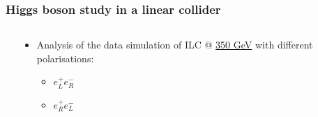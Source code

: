 \documentclass{beamer}
\begin{document}
    \begin{frame}
    \frametitle{Higgs boson study in a linear collider}

    \vspace{-0.3cm}
    \begin{columns}[c]
        \begin{column}{5cm}
            \begin{center}
            \end{center}
        \end{column}
        \begin{column}{5cm}
            \begin{itemize}
                \item Analysis of the data simulation of ILC @ \hyperlink{Xsec}{350 GeV} with different polarisations:
                    \begin{itemize}
                        \item $e^+_L e^-_R$
                        \item $e^+_R e^-_L$
                    \end{itemize}
            \end{itemize}
        \end{column}
    \end{columns}

\end{frame}
\end{document}
